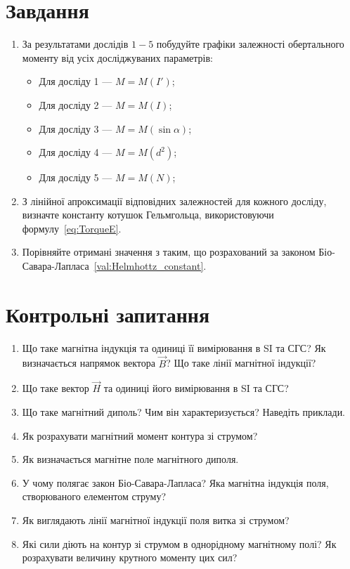 \section{Завдання}
\begin{enumerate}
	\item За результатами дослідів $1 - 5$ побудуйте графіки залежності обертального моменту від усіх досліджуваних параметрів:
	      \begin{itemize}
		      \item Для досліду 1 --- $M = M(I')$;
		      \item Для досліду 2 --- $M = M(I)$;
		      \item Для досліду 3 --- $M = M(\sin\alpha)$;
		      \item Для досліду 4 --- $M = M(d^2)$;
		      \item Для досліду 5 --- $M = M(N)$;
	      \end{itemize}
	\item З лінійної апроксимації відповідних залежностей для кожного досліду, визначте константу котушок Гельмгольца, використовуючи формулу~\eqref{eq:TorqueE}.
	\item Порівняйте отримані значення з таким, що розрахований за законом Біо-Савара-Лапласа~\eqref{val:Helmhottz_constant}.
\end{enumerate}

\section*{Контрольні запитання}

\begin{enumerate}
	\item Що таке магнітна індукція та одиниці її вимірювання в SI та СГС? Як визначається напрямок вектора $\vec{B}$? Що таке лінії магнітної індукції?
	\item Що таке вектор $\vec{H}$ та одиниці його вимірювання в SI та СГС?
	\item Що таке магнітний диполь? Чим він характеризується? Наведіть прик\-лади.
	\item Як розрахувати магнітний момент контура зі струмом?
	\item Як визначається магнітне поле магнітного диполя.
	\item У чому полягає закон Біо-Савара-Лапласа? Яка магнітна індукція поля, створюваного елементом струму?
	\item Як виглядають лінії магнітної індукції поля витка зі струмом?
	\item Які сили діють на контур зі струмом в однорідному магнітному полі? Як розрахувати величину крутного моменту цих сил?
\end{enumerate}

